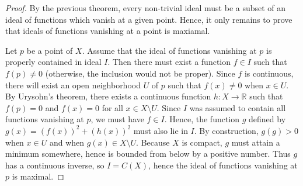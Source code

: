 \documentclass[12pt]{article}
\begin{document}
\begin{proof}
By the previous theorem, every non-trivial ideal must be a subset of an ideal of
functions which vanish at a given point.  Hence, it only remains to prove that
ideals of functions vanishing at a point is maxiamal.

Let $p$ be a point of $X$.  Assume that the ideal of functions vanishing at $p$
is properly contained in ideal $I$.  Then there must exist a function $f \in I$
such that $f (p) \neq 0$ (otherwise, the inclusion would not be proper).  Since
$f$ is continuous, there will exist an open neighborhood $U$ of $p$ such that
$f(x) \neq 0$ when $x \in U$.  By Urysohn's theorem, there exists a continuous 
function $h \colon X \to \mathbb{R}$ such that $f(p) = 0$ and $f(x) = 0$ for
all $x \in X \setminus U$.  Since $I$ was assumed to contain all functions vanishing 
at $p$, we must have $f \in I$.  Hence, the function $g$ defined by $g(x) = 
(f(x))^2 + (h(x))^2$ must also lie in $I$.  By construction, $g(g) > 0$
when $x \in U$ and when $g(x) \in X \setminus U$.  Because $X$ is compact,
$g$ must attain a minimum somewhere, hence is bounded from below by a
positive number.  Thus $g$ has a continuous inverse, so $I = C(X)$, hence the
ideal of functions vanishing at $p$ is maximal.
\end{proof}

\end{document}
